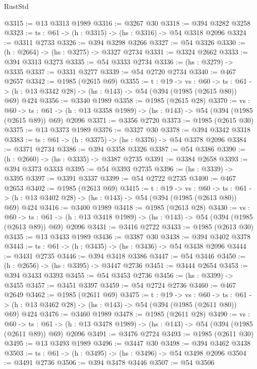 \begin{lexlean}{RustStd}
\begin{coremodule}
@3315 := @13 @3313 @1989
@3316 := @3267 @30
@3318 := @394 @3282 @3258
@3323 := {ts : @61} -> (h : @3315) -> (hs : @3316) -> @54 @3318 @2096
@3324 := @3311 @2733
@3326 := @394 @3298 @3266
@3327 := @54 @3326
@3330 := (h : @2664) -> (hs : @3275) -> @3327 @2734
@3331 := @3324 @2662
@3333 := @394 @3313 @3273
@3335 := @54 @3333 @2734
@3336 := (hs : @3279) -> @3335
@3337 := @3331 @3277
@3339 := @54 @2720 @2734
@3340 := @467 @2657
@3342 := @1985 (@2615 @69)
@3355 := {t : @19} ->
  {vs : @60} ->
  {ts : @61} -> (h : @13 @3342 @28) -> (hs : @143) -> @54 (@394 (@1985 (@2615 @80)) @69) @424
@3356 := @3340 @1989
@3358 := @1985 (@2615 @28)
@3370 := {vs : @60} ->
  {ts : @61} -> (h : @13 @3358 @1989) -> (hs : @143) -> @54 (@394 (@1985 (@2615 @89)) @69) @2096
@3371 := @3356 @2720
@3373 := @1985 (@2615 @30)
@3375 := @13 @3373 @1989
@3376 := @3327 @30
@3378 := @394 @3342 @3318
@3383 := {ts : @61} -> (h : @3375) -> (hs : @3376) -> @54 @3378 @2096
@3384 := @3371 @2734
@3386 := @394 @3358 @3326
@3387 := @54 @3386
@3390 := (h : @2660) -> (hs : @3335) -> @3387 @2735
@3391 := @3384 @2658
@3393 := @394 @3373 @3333
@3395 := @54 @3393 @2735
@3396 := (hs : @3339) -> @3395
@3397 := @3391 @3337
@3399 := @54 @2722 @2735
@3400 := @467 @2653
@3402 := @1985 (@2613 @69)
@3415 := {t : @19} ->
  {vs : @60} ->
  {ts : @61} -> (h : @13 @3402 @28) -> (hs : @143) -> @54 (@394 (@1985 (@2613 @80)) @69) @424
@3416 := @3400 @1989
@3418 := @1985 (@2613 @28)
@3430 := {vs : @60} ->
  {ts : @61} -> (h : @13 @3418 @1989) -> (hs : @143) -> @54 (@394 (@1985 (@2613 @89)) @69) @2096
@3431 := @3416 @2722
@3433 := @1985 (@2613 @30)
@3435 := @13 @3433 @1989
@3436 := @3387 @30
@3438 := @394 @3402 @3378
@3443 := {ts : @61} -> (h : @3435) -> (hs : @3436) -> @54 @3438 @2096
@3444 := @3431 @2735
@3446 := @394 @3418 @3386
@3447 := @54 @3446
@3450 := (h : @2656) -> (hs : @3395) -> @3447 @2736
@3451 := @3444 @2654
@3453 := @394 @3433 @3393
@3455 := @54 @3453 @2736
@3456 := (hs : @3399) -> @3455
@3457 := @3451 @3397
@3459 := @54 @2724 @2736
@3460 := @467 @2649
@3462 := @1985 (@2611 @69)
@3475 := {t : @19} ->
  {vs : @60} ->
  {ts : @61} -> (h : @13 @3462 @28) -> (hs : @143) -> @54 (@394 (@1985 (@2611 @80)) @69) @424
@3476 := @3460 @1989
@3478 := @1985 (@2611 @28)
@3490 := {vs : @60} ->
  {ts : @61} -> (h : @13 @3478 @1989) -> (hs : @143) -> @54 (@394 (@1985 (@2611 @89)) @69) @2096
@3491 := @3476 @2724
@3493 := @1985 (@2611 @30)
@3495 := @13 @3493 @1989
@3496 := @3447 @30
@3498 := @394 @3462 @3438
@3503 := {ts : @61} -> (h : @3495) -> (hs : @3496) -> @54 @3498 @2096
@3504 := @3491 @2736
@3506 := @394 @3478 @3446
@3507 := @54 @3506

\end{coremodule}
\end{lexlean}
